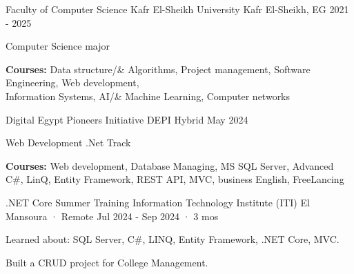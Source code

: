 

\begin{cventries}

  \cventry
    {Faculty of Computer Science} %
    {Kafr El-Sheikh University} %
    {Kafr El-Sheikh, EG} %
    {2021 - 2025} %
    {
      \begin{cvitems} %
        \item {Computer Science major}
        \item {\textbf{Courses:} Data structure/\& Algorithms, Project management, Software Engineering, Web development,\\ Information Systems, AI/\& Machine Learning, Computer networks}
      \end{cvitems}
    }  
     \cventry
    {Digital Egypt Pioneers Initiative} %
    {DEPI} %
    {Hybrid} %
    {May 2024} %
    {
      \begin{cvitems} %
        \item {Web Development .Net Track}
        \item {\textbf{Courses:} Web development, Database Managing, MS SQL Server, Advanced C#, LinQ, Entity Framework, REST API, MVC, business English, FreeLancing }
      \end{cvitems}
    }  
     \cventry
    {.NET Core Summer Training} %
    {Information Technology Institute (ITI)} %
    {El Mansoura · Remote} %
    {Jul 2024 - Sep 2024 · 3 mos} %
    {
      \begin{cvitems} %
        \item {Learned about: SQL Server, C\#, LINQ, Entity Framework, .NET Core, MVC.}
        \item {Built a CRUD project for College Management.}
      \end{cvitems}
    }  
\end{cventries}

